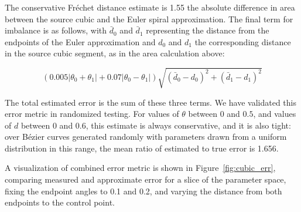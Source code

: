 \documentclass[sigconf, nonacm]{acmart}
\begin{document}
The conservative Fréchet distance estimate is 1.55 the absolute difference in area between the source cubic and the Euler spiral approximation. The final term for imbalance is as follows, with $\bar{d}_0$ and $\bar{d}_1$ representing the distance from the endpoints of the Euler approximation and $d_0$ and $d_1$ the corresponding distance in the source cubic segment, as in the area calculation above:

\[
    (0.005|\theta_0+\theta_1| + 0.07|\theta_0 - \theta_1|)\sqrt{(\bar{d}_0 - d_0)^2 + (\bar{d}_1 - d_1)^2}
\]

The total estimated error is the sum of these three terms. We have validated this error metric in randomized testing. For values of $\theta$ between $0$ and $0.5$, and values of $d$ between $0$ and $0.6$, this estimate is always conservative, and it is also tight: over Bézier curves generated randomly with parameters drawn from a uniform distribution in this range, the mean ratio of estimated to true error is 1.656.

A visualization of combined error metric is shown in Figure~\ref{fig:cubic_err}, comparing measured and approximate error for a slice of the parameter space, fixing the endpoint angles to 0.1 and 0.2, and varying the distance from both endpoints to the control point.
\end{document}
